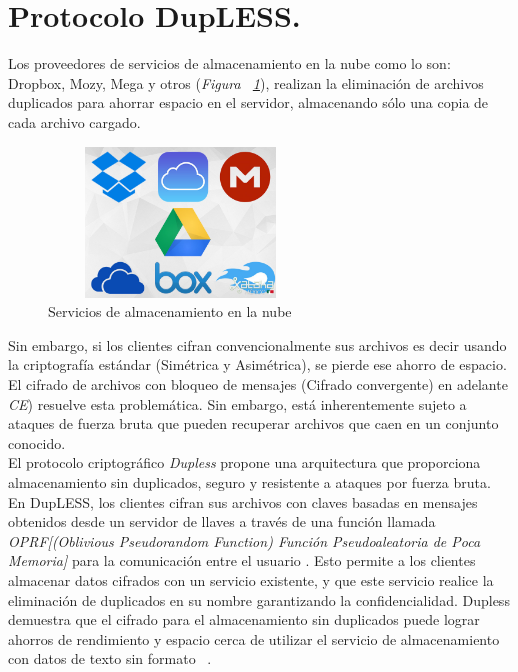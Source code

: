 


\section{Protocolo DupLESS. }
Los proveedores de servicios de almacenamiento en la nube como lo son:  Dropbox, Mozy, Mega y otros (\textit{Figura ~\ref{fig:3-1-0}}), realizan la eliminación de archivos duplicados para ahorrar espacio en el servidor, almacenando sólo una copia de cada archivo cargado. \\

\begin{figure}[H]
\centering
	\includegraphics[width=7cm, height=4cm]{./images/servicios_nube.jpg}
	\caption{Servicios de almacenamiento en la nube}
	\label{fig:3-1-0}
\end{figure}


Sin embargo, si los clientes cifran convencionalmente sus archivos es decir usando la criptografía estándar (Simétrica y Asimétrica), se pierde ese ahorro de espacio. El cifrado de archivos con bloqueo de mensajes (Cifrado convergente) en adelante \textit{CE}) resuelve esta problemática. Sin embargo, está inherentemente sujeto a ataques de fuerza bruta que pueden recuperar archivos que caen en un conjunto conocido.\\

El protocolo criptográfico \textit{Dupless} propone una arquitectura que proporciona almacenamiento sin duplicados, seguro y resistente a ataques por fuerza bruta. En DupLESS, los clientes cifran sus archivos con claves basadas en mensajes obtenidos
desde un servidor de llaves a través de una función llamada \textit{OPRF[(Oblivious Pseudorandom Function) Función Pseudoaleatoria de Poca Memoria] } para la comunicación entre el usuario . Esto permite a los clientes almacenar datos cifrados con un servicio existente, y que este servicio realice la eliminación de duplicados en su nombre garantizando la confidencialidad. Dupless demuestra que el cifrado para el almacenamiento sin duplicados puede lograr ahorros de rendimiento y espacio cerca de utilizar el servicio de almacenamiento con datos de texto sin formato ~\cite{dupless}. \\



